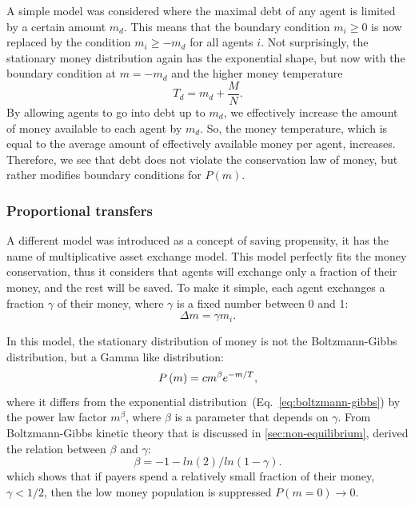 A simple model was considered where the maximal debt of any agent is limited by a certain
amount $m_d$. This means that the boundary condition $m_i \geq 0$ is now
replaced by the condition $m_i \geq -m_d$ for all agents $i$.
Not surprisingly, the stationary money distribution again has
the exponential shape, but now with the boundary condition at
$m=-m_d$ and the higher money temperature
\begin{equation}
    T_d = m_d + \frac{M}{N}.
\end{equation}
By allowing agents to go into debt up to $m_d$, we effectively increase
the amount of money available to each agent by $m_d$. So, the money
temperature, which is equal to the average amount of effectively
available money per agent, increases. Therefore, we see that debt does not violate the conservation law of money, but
rather modifies boundary conditions for $P(m)$.



\subsubsection{Proportional transfers} %
A different model \cite{ispolatov1998wealth} was introduced as a concept of saving propensity, it has the name of multiplicative asset exchange model.
This model perfectly fits the money conservation, thus it considers that agents will exchange only a fraction of their money, and the rest will be saved.
To make it simple, each agent exchanges a fraction $\gamma$ of their money, where $\gamma$ is a fixed number between 0 and 1:
\begin{equation}
\label{eq:proportional-transfers}    
    \Delta m = \gamma m_i.
\end{equation}

In this model, the stationary distribution of money is not the Boltzmann-Gibbs distribution, but a Gamma like distribution:
\begin{equation}
    P\left(m\right) = c m^{\beta} e^{-m/T},
\label{eq:gamma-distribution}
\end{equation}
where it differs from the exponential distribution~(Eq.~\ref{eq:boltzmann-gibbs}) by the power law factor $m^{\beta}$, where $\beta$ is a parameter that depends on $\gamma$.
From Boltzmann-Gibbs kinetic theory that is discussed in \ref{sec:non-equilibrium}, \cite{ispolatov1998wealth} derived the relation between $\beta$ and $\gamma$:
\begin{equation}
    \beta = - 1 - ln(2)/ln(1-\gamma).
\end{equation}
which shows that if payers spend a relatively small fraction of their money, $\gamma < 1/2$, then the low money population is suppressed $P(m = 0) \rightarrow 0$.

